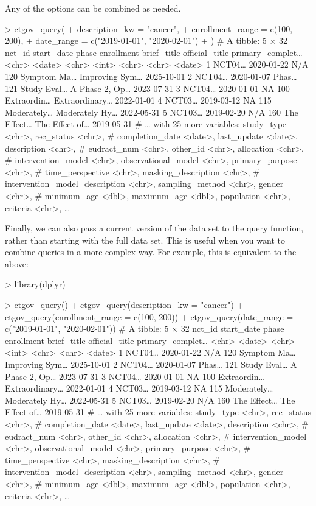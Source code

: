 Any of the options can be combined as needed.

\begin{example}
> ctgov_query(
+   description_kw = "cancer",
+   enrollment_range = c(100, 200),
+   date_range = c("2019-01-01", "2020-02-01")
+ )
# A tibble: 5 × 32
  nct_id start_date phase enrollment brief_title official_title primary_complet…
  <chr>  <date>     <chr>      <int> <chr>       <chr>          <date>
1 NCT04… 2020-01-22 N/A          120 Symptom Ma… Improving Sym… 2025-10-01
2 NCT04… 2020-01-07 Phas…        121 Study Eval… A Phase 2, Op… 2023-07-31
3 NCT04… 2020-01-01 NA           100 Extraordin… Extraordinary… 2022-01-01
4 NCT03… 2019-03-12 NA           115 Moderately… Moderately Hy… 2022-05-31
5 NCT03… 2019-02-20 N/A          160 The Effect… The Effect of… 2019-05-31
# … with 25 more variables: study_type <chr>, rec_status <chr>,
#   completion_date <date>, last_update <date>, description <chr>,
#   eudract_num <chr>, other_id <chr>, allocation <chr>,
#   intervention_model <chr>, observational_model <chr>, primary_purpose <chr>,
#   time_perspective <chr>, masking_description <chr>,
#   intervention_model_description <chr>, sampling_method <chr>, gender <chr>,
#   minimum_age <dbl>, maximum_age <dbl>, population <chr>, criteria <chr>, …
\end{example}

Finally, we can also pass a current version of the data set to the query
function, rather than starting with the full data set. This is useful when
you want to combine queries in a more complex way. For example, this is
equivalent to the above:

\begin{example}
> library(dplyr)

> ctgov_query() %
+   ctgov_query(description_kw = "cancer") %
+   ctgov_query(enrollment_range = c(100, 200)) %
+   ctgov_query(date_range = c("2019-01-01", "2020-02-01"))
# A tibble: 5 × 32
  nct_id start_date phase enrollment brief_title official_title primary_complet…
  <chr>  <date>     <chr>      <int> <chr>       <chr>          <date>
1 NCT04… 2020-01-22 N/A          120 Symptom Ma… Improving Sym… 2025-10-01
2 NCT04… 2020-01-07 Phas…        121 Study Eval… A Phase 2, Op… 2023-07-31
3 NCT04… 2020-01-01 NA           100 Extraordin… Extraordinary… 2022-01-01
4 NCT03… 2019-03-12 NA           115 Moderately… Moderately Hy… 2022-05-31
5 NCT03… 2019-02-20 N/A          160 The Effect… The Effect of… 2019-05-31
# … with 25 more variables: study_type <chr>, rec_status <chr>,
#   completion_date <date>, last_update <date>, description <chr>,
#   eudract_num <chr>, other_id <chr>, allocation <chr>,
#   intervention_model <chr>, observational_model <chr>, primary_purpose <chr>,
#   time_perspective <chr>, masking_description <chr>,
#   intervention_model_description <chr>, sampling_method <chr>, gender <chr>,
#   minimum_age <dbl>, maximum_age <dbl>, population <chr>, criteria <chr>, …
\end{example}

